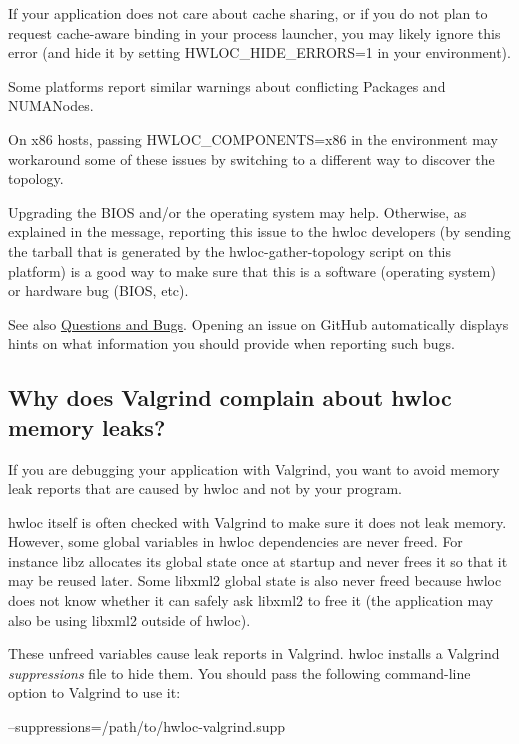 If your application does not care about cache sharing, or if you do not plan to request cache-\/aware binding in your process launcher, you may likely ignore this error (and hide it by setting H\+W\+L\+O\+C\+\_\+\+H\+I\+D\+E\+\_\+\+E\+R\+R\+O\+RS=1 in your environment).

Some platforms report similar warnings about conflicting Packages and N\+U\+M\+A\+Nodes.

On x86 hosts, passing {\ttfamily H\+W\+L\+O\+C\+\_\+\+C\+O\+M\+P\+O\+N\+E\+N\+TS=x86} in the environment may workaround some of these issues by switching to a different way to discover the topology.

Upgrading the B\+I\+OS and/or the operating system may help. Otherwise, as explained in the message, reporting this issue to the hwloc developers (by sending the tarball that is generated by the hwloc-\/gather-\/topology script on this platform) is a good way to make sure that this is a software (operating system) or hardware bug (B\+I\+OS, etc).

See also \hyperlink{index_bugs}{Questions and Bugs}. Opening an issue on Git\+Hub automatically displays hints on what information you should provide when reporting such bugs.\hypertarget{a00394_faq_valgrind}{}\subsection{Why does Valgrind complain about hwloc memory leaks?}\label{a00394_faq_valgrind}
If you are debugging your application with Valgrind, you want to avoid memory leak reports that are caused by hwloc and not by your program.

hwloc itself is often checked with Valgrind to make sure it does not leak memory. However, some global variables in hwloc dependencies are never freed. For instance libz allocates its global state once at startup and never frees it so that it may be reused later. Some libxml2 global state is also never freed because hwloc does not know whether it can safely ask libxml2 to free it (the application may also be using libxml2 outside of hwloc).

These unfreed variables cause leak reports in Valgrind. hwloc installs a Valgrind {\itshape suppressions} file to hide them. You should pass the following command-\/line option to Valgrind to use it\+: \begin{DoxyVerb}  --suppressions=/path/to/hwloc-valgrind.supp
\end{DoxyVerb}


